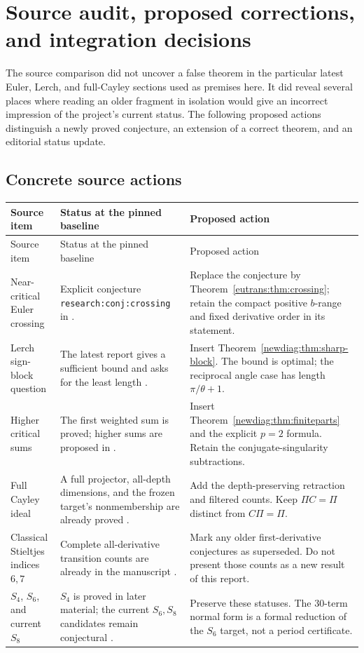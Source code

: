 \section{Source audit, proposed corrections, and integration decisions}
\label{sec:audit}

The source comparison did not uncover a false theorem in the particular
latest Euler, Lerch, and full-Cayley sections used as premises here.
It did reveal several places where reading an older fragment in isolation
would give an incorrect impression of the project's current status.
The following proposed actions distinguish a newly proved conjecture,
an extension of a correct theorem, and an editorial status update.

\subsection{Concrete source actions}

\begin{longtable}{@{}>{\raggedright\arraybackslash}p{}>{\raggedright\arraybackslash}p{}>{\raggedright\arraybackslash}p{}@{}}
\toprule
Source item & Status at the pinned baseline & Proposed action\\
\midrule
\endfirsthead
\toprule
Source item & Status at the pinned baseline & Proposed action\\
\midrule
\endhead
Near-critical Euler crossing & Explicit conjecture
\texttt{research:conj:crossing} in \cite{RepoEuler}. & Replace the conjecture
by Theorem~\ref{eutrans:thm:crossing}; retain the compact positive
$b$-range and fixed derivative order in its statement.\\[5pt]
Lerch sign-block question & The latest report gives a sufficient bound
and asks for the least length \cite{RepoLerch}. & Insert
Theorem~\ref{newdiag:thm:sharp-block}. The bound is optimal; the reciprocal
angle case has length $\pi/\theta+1$.\\[5pt]
Higher critical sums & The first weighted sum is proved; higher sums
are proposed in \cite{RepoLerch}. & Insert
Theorem~\ref{newdiag:thm:finiteparts} and the explicit $p=2$ formula.
Retain the conjugate-singularity subtractions.\\[5pt]
Full Cayley ideal & A full projector, all-depth dimensions, and the
frozen target's nonmembership are already proved
\cite{depth:PriorProjection}. & Add the depth-preserving retraction
and filtered counts. Keep $\Pi C=\Pi$ distinct from $C\Pi=\Pi$.\\[5pt]
Classical Stieltjes indices $6,7$ & Complete all-derivative transition
counts are already in the manuscript \cite{RepoZeros}. & Mark any
older first-derivative conjectures as superseded. Do not present those
counts as a new result of this report.\\[5pt]
$S_4$, $S_6$, and current $S_8$ & $S_4$ is proved in later material;
the current $S_6,S_8$ candidates remain conjectural
\cite{RepoManuscript}. & Preserve these statuses. The 30-term normal form
is a formal reduction of the $S_6$ target, not a period certificate.\\
\bottomrule
\end{longtable}

